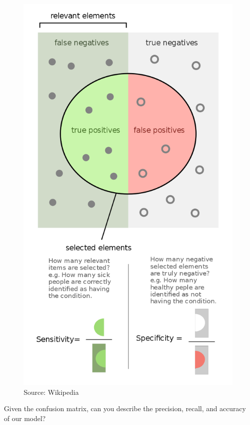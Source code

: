 \documentclass[
]{article}
\newenvironment{Shaded}{\begin{snugshade}}{\end{snugshade}}
\newcommand{\FloatTok}[1]{\textcolor[rgb]{0.00,0.00,0.81}{#1}}
\newcommand{\FunctionTok}[1]{\textcolor[rgb]{0.00,0.00,0.00}{#1}}
\newcommand{\NormalTok}[1]{#1}
\newcommand{\OtherTok}[1]{\textcolor[rgb]{0.56,0.35,0.01}{#1}}
\newcommand{\SpecialCharTok}[1]{\textcolor[rgb]{0.00,0.00,0.00}{#1}}
\newcommand{\StringTok}[1]{\textcolor[rgb]{0.31,0.60,0.02}{#1}}
\begin{document}
\begin{figure}
\centering
\includegraphics{assets/sensitivity.png}
\caption{Source: Wikipedia}
\end{figure}

Given the confusion matrix, can you describe the precision, recall, and
accuracy of our model?

\begin{Shaded}
\end{Shaded}
\end{document}
